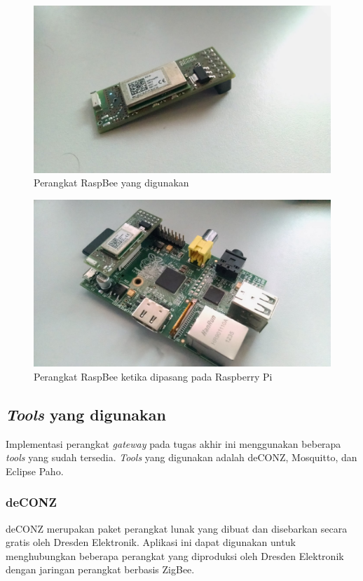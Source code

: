 \begin{figure}
	\centering
	\includegraphics[width=.9\textwidth]{pics/raspbee.jpg}
	\caption{Perangkat RaspBee yang digunakan}
	\label{fig:raspbee}
\end{figure}
\begin{figure}
	\centering
	\includegraphics[width=.9\textwidth]{pics/raspberry+raspbee.jpg}
	\caption{Perangkat RaspBee ketika dipasang pada Raspberry Pi}
	\label{fig:raspbeeraspberry}
\end{figure}

\subsection{\textit{Tools} yang digunakan}
Implementasi perangkat \textit{gateway} pada tugas akhir ini menggunakan beberapa \textit{tools} yang sudah tersedia. \textit{Tools} yang digunakan adalah deCONZ, Mosquitto, dan Eclipse Paho.

\subsubsection{deCONZ}
deCONZ merupakan paket perangkat lunak yang dibuat dan disebarkan secara gratis oleh Dresden Elektronik. Aplikasi ini dapat digunakan untuk menghubungkan beberapa perangkat yang diproduksi oleh Dresden Elektronik dengan jaringan perangkat berbasis ZigBee. 

